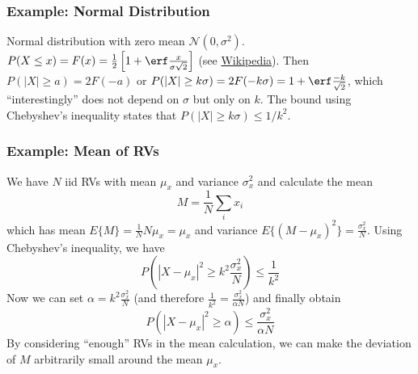 \subsubsection*{Example: Normal Distribution}

Normal distribution with zero mean $\mathcal{N}(0, \sigma^2)$. $P(X \leq x) = F(x) = \frac{1}{2} \left[ 1 + \erf \frac{x}{\sigma\sqrt{2}} \right]$ (see \href{https://en.wikipedia.org/wiki/Normal_distribution}{Wikipedia}). Then $P(|X| \geq a) = 2 F(-a)$ or $P(|X| \geq k\sigma) = 2 F(-k\sigma) = 1 + \erf \frac{-k}{\sqrt{2}}$, which ``interestingly'' does not depend on $\sigma$ but only on $k$.
%
The bound using Chebyshev's inequality states that $P(|X| \geq k \sigma) \leq 1/k^2$.

\subsubsection*{Example: Mean of RVs}

We have $N$ iid RVs with mean \(\mu_x\) and variance \(\sigma_x^2\) and calculate the mean
%
\begin{equation*}
M = \frac{1}{N} \sum_i x_i
\end{equation*}
%
which has mean \(E\{M\} = \frac{1}{N} N \mu_x = \mu_x\) and variance \(E\{(M-\mu_x)^2\} = \frac{\sigma_x^2}{N}\). Using Chebyshev's inequality, we have
%
\begin{equation*}
P \left(| X-\mu_x |^2 \geq k^2 \frac{\sigma_x^2}{N} \right) \leq \frac{1}{k^2}
\end{equation*}
%
Now we can set \(\alpha = k^2 \frac{\sigma_x^2}{N}\) (and therefore \(\frac{1}{k^2} = \frac{\sigma_x^2}{\alpha N}\)) and finally obtain
%
\begin{equation*}
P \left(| X-\mu_x |^2 \geq \alpha \right) \leq \frac{\sigma_x^2}{\alpha N}
\end{equation*}
%
By considering ``enough'' RVs in the mean calculation, we can make the deviation of \(M\) arbitrarily small around the mean \(\mu_x\).
